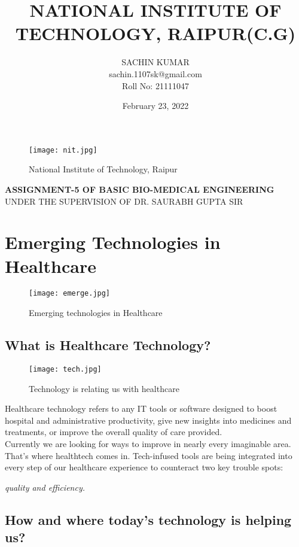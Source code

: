 \documentclass[12pts]{article}
\title{\textbf{NATIONAL INSTITUTE OF TECHNOLOGY, RAIPUR(C.G)}}
\author{SACHIN KUMAR\\sachin.1107sk@gmail.com\\Roll No: 21111047}
\date{February 23, 2022}
\begin{document}
\maketitle

\begin{figure}[h]
\centering
\texttt{[image: nit.jpg]}
\caption{National Institute of Technology, Raipur}
\end{figure}

\textbf{ASSIGNMENT-5 OF BASIC BIO-MEDICAL ENGINEERING}\\
\centering
UNDER THE SUPERVISION OF DR. SAURABH GUPTA SIR\\

\clearpage

\section*{Emerging Technologies in Healthcare}
\begin{figure}[h]
\centering
\texttt{[image: emerge.jpg]}
\caption{Emerging technologies in Healthcare}
\end{figure}

\subsection*{What is Healthcare Technology?}


\begin{figure}[h]
\centering
\texttt{[image: tech.jpg]}
\caption{Technology is relating us with healthcare}
\end{figure}


Healthcare technology refers to any IT tools or software designed to boost hospital and administrative productivity, give new insights into medicines and treatments, or improve the overall quality of care provided.\\
Currently we are looking for ways to improve in nearly every imaginable area. That’s where healthtech comes in. Tech-infused tools are being integrated into every step of our healthcare experience to counteract two key trouble spots: \begin{large}
\textit{quality and efficiency.}
\end{large}

\subsection*{How and where today's technology is helping us?}
\end{document}
